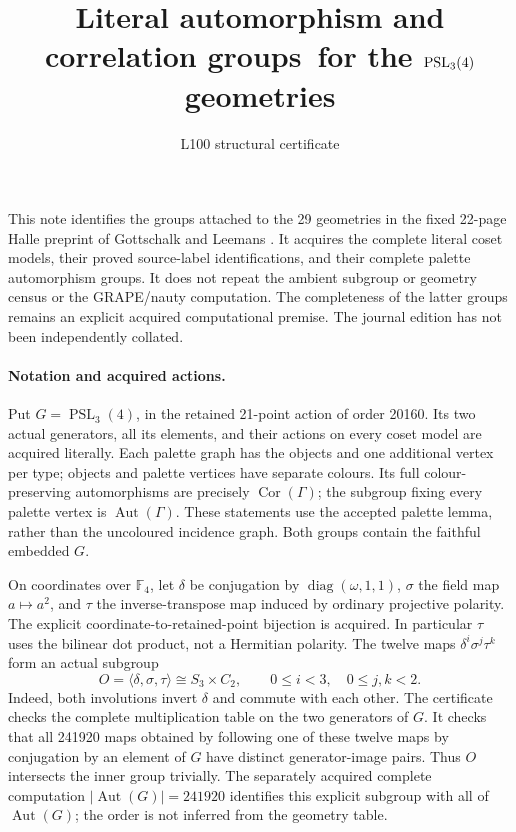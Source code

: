 \documentclass[11pt]{article}
\title{Literal automorphism and correlation groups\ for the $\PSL_3(4)$ geometries}
\author{L100 structural certificate}\date{}
\newcommand{\Aut}{\operatorname{Aut}}\newcommand{\Cor}{\operatorname{Cor}}
\newcommand{\PSL}{\operatorname{PSL}}\newcommand{\PG}{\operatorname{PG}}
\begin{document}
\maketitle
This note identifies the groups attached to the 29 geometries in the fixed
22-page Halle preprint of Gottschalk and Leemans \cite{GL}. It acquires the
complete literal coset models, their proved source-label identifications, and
their complete palette automorphism groups. It does not repeat the ambient
subgroup or geometry census or the GRAPE/nauty computation. The completeness
of the latter groups remains an explicit acquired computational premise.
The journal edition has not been independently collated.

\paragraph{Notation and acquired actions.}
Put $G=\PSL_3(4)$, in the retained 21-point action of order 20160.
Its two actual generators, all its elements, and their actions on every
coset model are acquired literally. Each palette graph has the objects and
one additional vertex per type; objects and palette vertices have separate
colours. Its full colour-preserving automorphisms are precisely $\Cor(\Gamma)$;
the subgroup fixing every palette vertex is $\Aut(\Gamma)$. These statements
use the accepted palette lemma, rather than the uncoloured incidence graph.
Both groups contain the faithful embedded $G$.

On coordinates over $\mathbb F_4$, let $\delta$ be conjugation by
$\operatorname{diag}(\omega,1,1)$, $\sigma$ the field map $a\mapsto a^2$,
and $\tau$ the inverse-transpose map induced by ordinary projective polarity.
The explicit coordinate-to-retained-point bijection is acquired. In particular
$\tau$ uses the bilinear dot product, not a Hermitian polarity.
The twelve maps $\delta^i\sigma^j\tau^k$ form an actual subgroup
\[
 O=\langle\delta,\sigma,\tau\rangle\cong S_3\times C_2,
 \qquad 0\leq i<3,\quad 0\leq j,k<2.
\]
Indeed, both involutions invert $\delta$ and commute with each other.
The certificate checks the complete multiplication table on the two
generators of $G$. It checks that all 241920 maps obtained by following one
of these twelve maps by conjugation by an element of $G$ have distinct
generator-image pairs. Thus $O$ intersects the inner group trivially.
The separately acquired complete computation $|\Aut(G)|=241920$ identifies
this explicit subgroup with all of $\Aut(G)$; the order is not inferred
from the geometry table.
\end{document}
